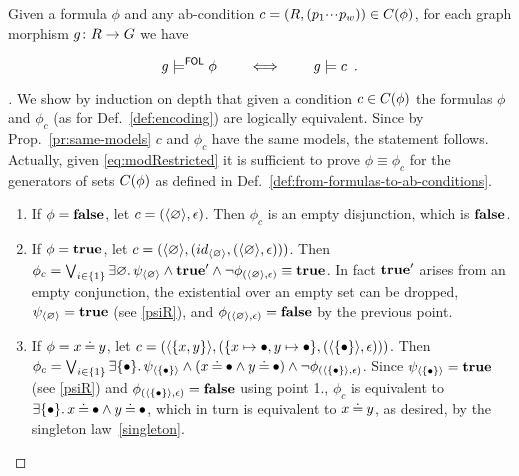 \begin{proposition}
  \label{pr:same-models-2}
Given a formula $\phi$ and any ab-condition $c = (R, (p_1{\cdotp\mkern-2mu\cdotp\mkern-2mu\cdotp\mkern1mu} p_w)) \in C({\phi})$, for each graph morphism $g \colon R \rightarrow G$ we have

\[ g \models^{\mathsf{FOL}} \phi \qquad \iff \qquad g \models c \enspace.\] 

\end{proposition}
\begin{proof}[]
We show by induction on depth that given a condition $c \in C({\phi})$ the formulas $\phi$ and $\phi_{c}$ (as for Def.~\ref{def:encoding}) are logically equivalent. 
Since by Prop.~\ref{pr:same-models} $c$ and $\phi_{c}$ have the same models, the statement follows. Actually, given \eqref{eq:modRestricted} it is sufficient to prove $\phi \equiv \phi_{c}$ for the generators of sets $C({\phi})$ as defined in Def.~\ref{def:from-formulas-to-ab-conditions}.

\begin{enumerate}
  \item 
  If $\phi = \textbf{false}$, %
  let $c = (\langle \varnothing \rangle, \epsilon)$. Then $\phi_c$ is an empty disjunction, which is $\textbf{false}$.
  
  \item If $\phi = \textbf{true}$, let $c = (\langle \varnothing \rangle, (id_{\langle \varnothing \rangle},(\langle \varnothing \rangle,\epsilon)))$. Then $\phi_c = \bigvee_{i \in \{1\}}  \exists \varnothing.\, \psi_{\langle \varnothing \rangle} \land \textbf{true}' \land \neg \phi_{(\langle \varnothing \rangle,\epsilon)} \equiv \textbf{true}$. In fact  $\textbf{true}'$ arises from an empty conjunction,  the existential over an empty set can be dropped, $\psi_{\langle \varnothing \rangle} = \textbf{true}$ (see \eqref{psiR}), and $\phi_{(\langle \varnothing \rangle,\epsilon)} = \textbf{false}$ by the previous point.
  \item 
If $\phi = x \mathbin{\doteq} y$, let $c = (\langle \{x,y\} \rangle, (\{x\mapsto \bullet,y \mapsto \bullet\}, (\langle \{\bullet\} \rangle,\epsilon)))$. Then $\phi_c = \bigvee_{i \in \{1\}}  \exists \{\bullet\} .\,  \psi_{\langle \{\bullet\} \rangle} \land (x \mathbin{\doteq} \bullet \land y \mathbin{\doteq} \bullet) \land \neg \phi_{(\langle \{\bullet\} \rangle,\epsilon)}$. Since $ \psi_{\langle \{\bullet\} \rangle} = \textbf{true}$ (see \eqref{psiR}) and $\phi_{(\langle \{\bullet\} \rangle,\epsilon)} = \textbf{false}$ using point 1., $\phi_c$ is equivalent to $\exists \{\bullet\} .\,  x \mathbin{\doteq} \bullet \land y \mathbin{\doteq} \bullet$, which in turn is equivalent to $x \mathbin{\doteq} y$, as desired, by the singleton law~\eqref{singleton}.


\end{enumerate}
\end{proof}
